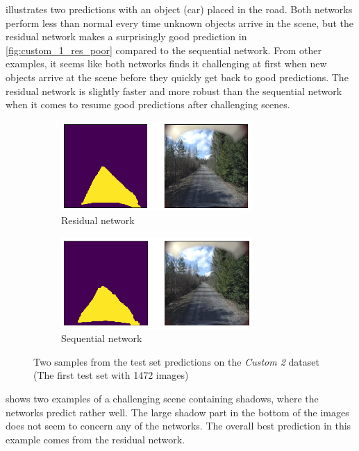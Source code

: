 \documentclass[USenglish]{ifimaster}  %
\begin{document}
 illustrates two predictions with an object (car) placed in the road. Both networks perform less than normal every time unknown objects arrive in the scene, but the residual network makes a surprisingly good prediction in \cref{fig:custom_1_res_poor} compared to the sequential network. From other examples, it seems like both networks finds it challenging at first when new objects arrive at the scene before they quickly get back to good predictions. The residual network is slightly faster and more robust than the sequential network when it comes to resume good predictions after challenging scenes.
\begin{figure}[ht]
\centering
\begin{subfigure}[b]{\textwidth}
\centering
\includegraphics[width=0.8\textwidth]{bilder/custom_2/474_res.png}
\caption{Residual network}
\label{fig:custom_2_res}
\end{subfigure}
\hfill
\begin{subfigure}[b]{\textwidth}
\centering
\includegraphics[width=0.8\textwidth]{bilder/custom_2/474_seq.png}
\caption{Sequential network}
\label{fig:custom_2_seq}
\end{subfigure}
\caption{Two samples from the test set predictions on the \textit{Custom 2} dataset (The first test set with 1472 images)}
\label{fig:custom_2_result}
\end{figure}

 shows two examples of a challenging scene containing shadows, where the networks predict rather well. The large shadow part in the bottom of the images does not seem to concern any of the networks. The overall best prediction in this example comes from the residual network. 
\end{document}
